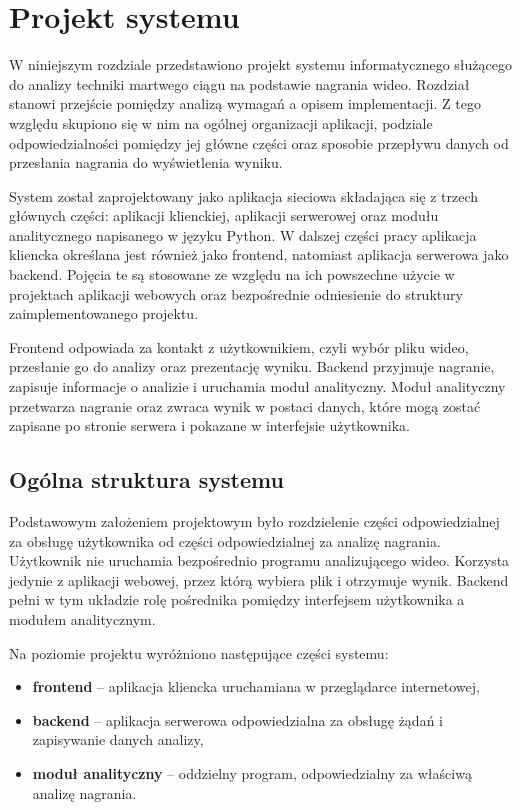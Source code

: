 \section{Projekt systemu}

W niniejszym rozdziale przedstawiono projekt systemu informatycznego służącego do analizy techniki martwego ciągu na podstawie nagrania wideo. Rozdział stanowi przejście pomiędzy analizą wymagań a opisem implementacji. Z tego względu skupiono się w nim na ogólnej organizacji aplikacji, podziale odpowiedzialności pomiędzy jej główne części oraz sposobie przepływu danych od przesłania nagrania do wyświetlenia wyniku.

System został zaprojektowany jako aplikacja sieciowa składająca się z trzech głównych części: aplikacji klienckiej, aplikacji serwerowej oraz modułu analitycznego napisanego w języku Python. W dalszej części pracy aplikacja kliencka określana jest również jako frontend, natomiast aplikacja serwerowa jako backend. Pojęcia te są stosowane ze względu na ich powszechne użycie w projektach aplikacji webowych oraz bezpośrednie odniesienie do struktury zaimplementowanego projektu.

Frontend odpowiada za kontakt z użytkownikiem, czyli wybór pliku wideo, przesłanie go do analizy oraz prezentację wyniku. Backend przyjmuje nagranie, zapisuje informacje o analizie i uruchamia moduł analityczny. Moduł analityczny przetwarza nagranie oraz zwraca wynik w postaci danych, które mogą zostać zapisane po stronie serwera i pokazane w interfejsie użytkownika.

    
\subsection{Ogólna struktura systemu}

Podstawowym założeniem projektowym było rozdzielenie części odpowiedzialnej za obsługę użytkownika od części odpowiedzialnej za analizę nagrania. Użytkownik nie uruchamia bezpośrednio programu analizującego wideo. Korzysta jedynie z aplikacji webowej, przez którą wybiera plik i otrzymuje wynik. Backend pełni w tym układzie rolę pośrednika pomiędzy interfejsem użytkownika a modułem analitycznym.

Na poziomie projektu wyróżniono następujące części systemu:

\begin{itemize}
\item \textbf{frontend} -- aplikacja kliencka uruchamiana w przeglądarce internetowej,
\item \textbf{backend} -- aplikacja serwerowa odpowiedzialna za obsługę żądań i zapisywanie danych analizy,
\item \textbf{moduł analityczny} -- oddzielny program, odpowiedzialny za właściwą analizę nagrania.
\end{itemize}

